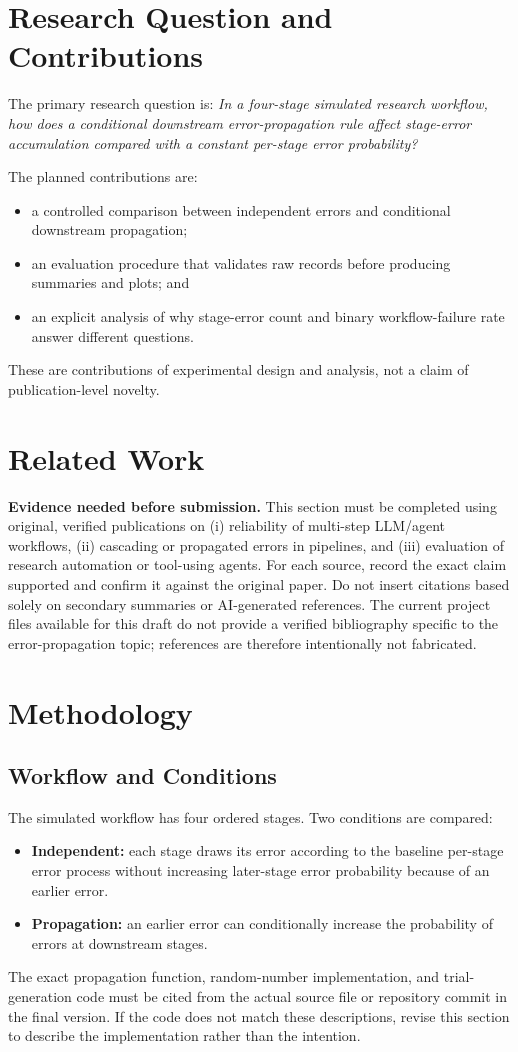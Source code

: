 \documentclass[conference]{IEEEtran}
\begin{document}
\section{Research Question and Contributions}
The primary research question is: \emph{In a four-stage simulated research workflow, how does a conditional downstream error-propagation rule affect stage-error accumulation compared with a constant per-stage error probability?}

The planned contributions are:
\begin{itemize}
  \item a controlled comparison between independent errors and conditional downstream propagation;
  \item an evaluation procedure that validates raw records before producing summaries and plots; and
  \item an explicit analysis of why stage-error count and binary workflow-failure rate answer different questions.
\end{itemize}
These are contributions of experimental design and analysis, not a claim of publication-level novelty.

\section{Related Work}
\textbf{Evidence needed before submission.} This section must be completed using original, verified publications on (i) reliability of multi-step LLM/agent workflows, (ii) cascading or propagated errors in pipelines, and (iii) evaluation of research automation or tool-using agents. For each source, record the exact claim supported and confirm it against the original paper. Do not insert citations based solely on secondary summaries or AI-generated references. The current project files available for this draft do not provide a verified bibliography specific to the error-propagation topic; references are therefore intentionally not fabricated.

\section{Methodology}
\subsection{Workflow and Conditions}
The simulated workflow has four ordered stages. Two conditions are compared:
\begin{itemize}
  \item \textbf{Independent:} each stage draws its error according to the baseline per-stage error process without increasing later-stage error probability because of an earlier error.
  \item \textbf{Propagation:} an earlier error can conditionally increase the probability of errors at downstream stages.
\end{itemize}
The exact propagation function, random-number implementation, and trial-generation code must be cited from the actual source file or repository commit in the final version. If the code does not match these descriptions, revise this section to describe the implementation rather than the intention.
\end{document}
